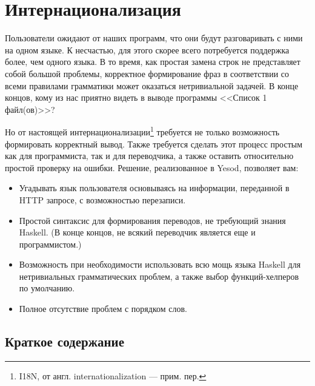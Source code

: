 \chapter{Интернационализация} %

Пользователи ожидают от наших программ, что они будут разговаривать с ними на одном языке. К несчастью, для этого скорее всего потребуется поддержка более, чем одного языка. В то время, как простая замена строк не представляет собой большой проблемы, корректное формирование фраз в соответствии со всеми правилами грамматики может оказаться нетривиальной задачей. В конце концов, кому из нас приятно видеть в выводе программы <<Список 1 файл(ов)>>?

Но от настоящей интернационализации\footnote{I18N, от англ. internationalization --- прим. пер.} требуется не только возможность формировать корректный вывод. Также требуется сделать этот процесс простым как для программиста, так и для переводчика, а также оставить относительно простой проверку на ошибки. Решение, реализованное в Yesod, позволяет вам:

\begin{itemize}
  \item Угадывать язык пользователя основываясь на информации, переданной в HTTP запросе, с возможностью перезаписи.
  \item Простой синтаксис для формирования переводов, не требующий знания Haskell. (В конце концов, не всякий переводчик является еще и программистом.)
  \item Возможность при необходимости использовать всю мощь языка Haskell для нетривиальных грамматических проблем, а также выбор функций-хелперов по умолчанию. %
  \item Полное отсутствие проблем с порядком слов. %
\end{itemize}

\section{Краткое содержание} %

